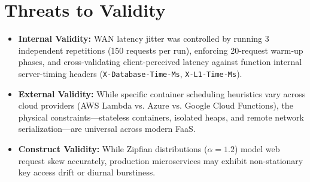 \documentclass[conference]{IEEEtran}
\begin{document}
\section{Threats to Validity}
\begin{itemize}
    \item \textbf{Internal Validity:} WAN latency jitter was controlled by running 3 independent repetitions (150 requests per run), enforcing 20-request warm-up phases, and cross-validating client-perceived latency against function internal server-timing headers (\texttt{X-Database-Time-Ms}, \texttt{X-L1-Time-Ms}).
    \item \textbf{External Validity:} While specific container scheduling heuristics vary across cloud providers (AWS Lambda vs. Azure vs. Google Cloud Functions), the physical constraints---stateless containers, isolated heaps, and remote network serialization---are universal across modern FaaS.
    \item \textbf{Construct Validity:} While Zipfian distributions ($\alpha = 1.2$) model web request skew accurately, production microservices may exhibit non-stationary key access drift or diurnal burstiness.
\end{itemize}

\end{document}
